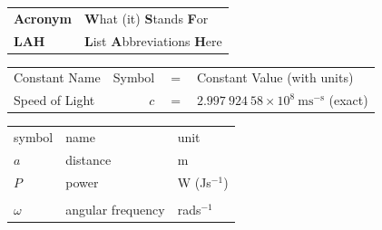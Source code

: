 \listoffigures  %

\listoftables  %

\listofalgorithms 

\clearpage  %


\begin{tabular}{ll}
	\textbf{Acronym} & \textbf{W}hat (it) \textbf{S}tands \textbf{F}or \\
	\textbf{LAH} & \textbf{L}ist \textbf{A}bbreviations \textbf{H}ere \\
\end{tabular}
\clearpage  %


\begin{tabular}{lrcl}
	 Constant Name & Symbol & = & Constant Value (with units) \\
	Speed of Light & $c$ & $=$ & $2.997\ 924\ 58\times10^{8}\ \mbox{ms}^{-\mbox{s}}$ (exact)\\
	
\end{tabular}
\clearpage  %


\begin{tabular}{lll}
	symbol & name & unit \\
	$a$ & distance & m \\
	$P$ & power & W (Js$^{-1}$) \\
	& & \\ %
	$\omega$ & angular frequency & rads$^{-1}$ \\
\end{tabular}
\clearpage


\pagestyle{empty}  %
\clearpage


